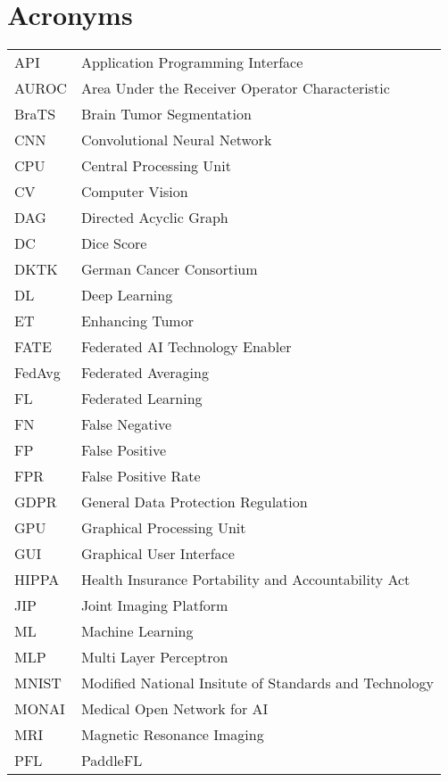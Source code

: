 \section*{Acronyms}
\begin{table}[H]
    \begin{tabular}{p{4cm} p{10cm}}
     API    & Application Programming Interface \\
     AUROC  & Area Under the Receiver Operator Characteristic \\
     BraTS  & Brain Tumor Segmentation \\
     CNN    & Convolutional Neural Network \\
     CPU    & Central Processing Unit \\
     CV     & Computer Vision \\
     DAG    & Directed Acyclic Graph \\
     DC     & Dice Score \\
     DKTK   & German Cancer Consortium \\
     DL     & Deep Learning \\
     ET     & Enhancing Tumor \\
     FATE   & Federated AI Technology Enabler \\
     FedAvg & Federated Averaging \\
     FL     & Federated Learning \\
     FN     & False Negative \\
     FP     & False Positive \\
     FPR    & False Positive Rate \\
     GDPR   & General Data Protection Regulation \\
     GPU    & Graphical Processing Unit \\
     GUI    & Graphical User Interface \\
     HIPPA  & Health Insurance Portability and Accountability Act \\
     JIP    & Joint Imaging Platform \\
     ML     & Machine Learning \\
     MLP    & Multi Layer Perceptron \\
     MNIST  & Modified National Insitute of Standards and Technology \\
     MONAI  & Medical Open Network for AI \\
     MRI    & Magnetic Resonance Imaging \\
     PFL    & PaddleFL \\

\end{tabular}
\end{table}
